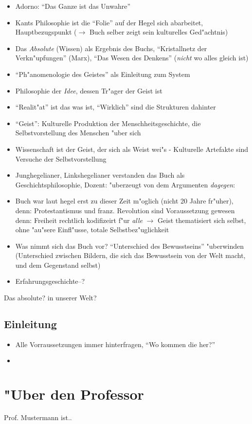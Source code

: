 \documentclass[emulatestandardclasses]{scrartcl}
\begin{document}
\begin{itemize}
  \item Adorno: "`Das Ganze ist das Unwahre"'
  \item Kants Philosophie ist die "`Folie"' auf der Hegel sich abarbeitet, Hauptbezugspunkt ($\rightarrow$ Buch selber zeigt sein kulturelles Ged"achtnis)
  \item Das \emph{Absolute} (Wissen) als Ergebnis des Buchs, "`Kristallnetz der Verkn"upfungen"' (Marx), "`Das Wesen des Denkens"' (\emph{nicht} wo alles gleich ist)
  \item "`Ph"anomenologie des Geistes"' als Einleitung zum System
  \item Philosophie der \emph{Idee}, dessen Tr"ager der Geist ist
  \item "`Realit"at"' ist das was ist, "`Wirklich"' sind die Strukturen dahinter
  \item "`Geist"': Kulturelle Produktion der Menschheitsgeschichte, die Selbstvorstellung des Menschen "uber sich
  \item Wissenschaft ist der Geist, der sich als Weist wei"s - Kulturelle Artefakte sind Versuche der Selbstvorstellung
  \item Junghegelianer, Linkshegelianer verstanden das Buch als Geschichtsphilosophie, Dozent: "uberzeugt von dem Argumenten \emph{dagegen}: 
  \item Buch war laut hegel erst zu dieser Zeit m"oglich (nicht 20 Jahre fr"uher), denn: Protestantismus und franz. Revolution sind Voraussetzung gewesen denn: Freiheit rechtlich kodifizeirt f"ur \emph{alle} $\rightarrow$ Geist thematisiert sich selbst, ohne "au"sere Einfl"usse, totale Selbstbez"uglichkeit
  \item Was nimmt sich das Buch vor? "`Unterschied des Bewusstseins"' "uberwinden (Unterschied zwischen Bildern, die sich das Bewusstsein von der Welt macht, und dem Gegenstand selbst)
  \item Erfahrungsgeschichte--?
\end{itemize}

Das absolute? in unserer Welt?


\subsection{Einleitung}

\begin{itemize}
  \item Alle Vorraussetzungen immer hinterfragen, "`Wo kommen die her?"'
  \item 
\end{itemize}


\newpage
\section{"Uber den Professor}
Prof. Mustermann ist..


\end{document}

